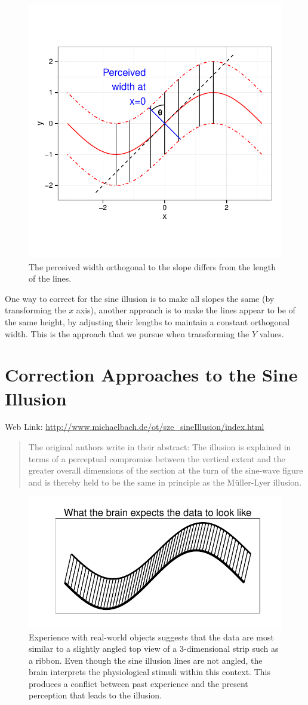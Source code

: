 \documentclass[11pt]{article}\usepackage{graphicx, color}
\begin{document}
\begin{figure}[htbp]
\centering


\includegraphics[width=.5\linewidth, keepaspectratio=TRUE]{figure/fig-transform-illustration}
\caption{The perceived width orthogonal to the slope differs from the length of the lines.}
\end{figure}

One way to correct for the sine illusion is to make all slopes the same (by transforming the $x$ axis), another approach is to make the lines appear to be of the same height, by adjusting their lengths to maintain a constant orthogonal width. This is the approach that we pursue when transforming the $Y$ values. 
\clearpage
\section{Correction Approaches to the Sine Illusion}

Web Link: \url{http://www.michaelbach.de/ot/sze_sineIllusion/index.html}
\begin{quote}
The original authors \citep{day:1991} write in their abstract: The illusion is explained in terms of a perceptual compromise between the vertical extent and the greater overall dimensions of the section at the turn of the sine-wave figure and is thereby held to be the same in principle as the M\"uller-Lyer illusion.
\end{quote}

\begin{figure}[h!tbp]\centering


\includegraphics[width=.5\linewidth, keepaspectratio=TRUE]{figure/fig-ribbon-illusion}
\caption{Experience with real-world objects suggests that the data are most similar to a slightly angled top view of a 3-dimensional strip such as a ribbon. Even though the sine illusion lines are not angled, the brain interprets the physiological stimuli within this context. This produces a conflict between past experience and the present perception that leads to the illusion.}
\end{figure}
\end{document}
